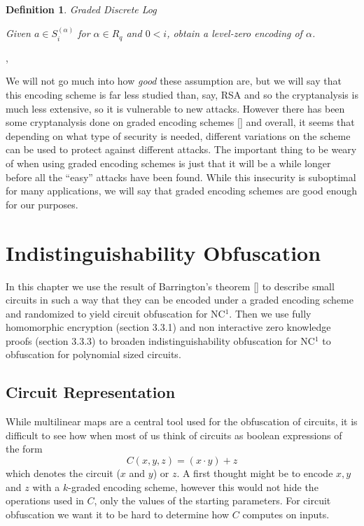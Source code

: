 \documentclass[12pt,twoside]{reedthesis}
\newtheorem{definition}{Definition}
\begin{document}
    \begin{definition}{Graded Discrete Log}
    \par Given $a\in S_i^{(\alpha)}$ for $\alpha \in R_q$ and $0<i$, obtain a level-zero encoding of $\alpha$.
    \end{definition},
    
    We will not go much into how \textit{good} these assumption are, but we will say that this encoding scheme is far less studied than, say, RSA and so the cryptanalysis is much less extensive, so it is vulnerable to new attacks. However there has been some cryptanalysis done on graded encoding schemes [\cite{GGH13}] and overall, it seems that depending on what type of security is needed, different variations on the scheme can be used to protect against different attacks. The important thing to be weary of when using graded encoding schemes is just that it will be a while longer before all the ``easy'' attacks have been found. While this insecurity is suboptimal for many applications, we will say that graded encoding schemes are good enough for our purposes.
    
    
    
    
    
    \chapter{Indistinguishability Obfuscation}
    In this chapter we use the result of Barrington's theorem [\cite{Barrington:1986:BPB:12130.12131}] to describe small circuits in such a way that they can be encoded under a graded encoding scheme and randomized to yield circuit obfuscation for NC$^1$. Then we use fully homomorphic encryption (section 3.3.1) and non interactive zero knowledge proofs (section 3.3.3) to broaden indistinguishability obfuscation for NC$^1$ to obfuscation for polynomial sized circuits.
    \section{Circuit Representation}
    While multilinear maps are a central tool used for the obfuscation of circuits, it is difficult to see how when most of us think of circuits as boolean expressions of the form
    $$C(x,y,z) = (x \cdot y) + z $$
    which denotes the circuit ($x$ and $y$) or $z$. A first thought might be to encode $x,y$ and $z$ with a $k$-graded encoding scheme, however this would not hide the operations used in $C$, only the values of the starting parameters. For circuit obfuscation we want it to be hard to determine how $C$ computes on inputs.
    
\end{document}
